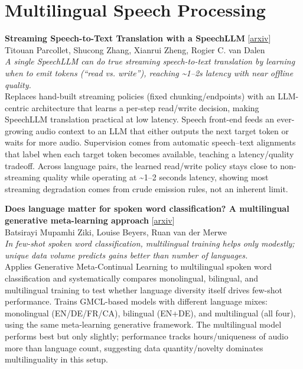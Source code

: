 \documentclass[12pt,letterpaper]{article}
\begin{document}
\medskip


\section*{Multilingual Speech Processing}

{\small\textbf{Streaming Speech-to-Text Translation with a SpeechLLM}} {\scriptsize[\href{https://arxiv.org/abs/2605.14766}{arxiv}]}\\
{\scriptsize Titouan Parcollet, Shucong Zhang, Xianrui Zheng, Rogier C. van Dalen}\\

{\small\textit{A single SpeechLLM can do true streaming speech-to-text translation by learning when to emit tokens (``read vs. write''), reaching \textasciitilde{}1--2s latency with near offline quality.}}\\[1pt]
{\footnotesize Replaces hand-built streaming policies (fixed chunking/endpoints) with an LLM-centric architecture that learns a per-step read/write decision, making SpeechLLM translation practical at low latency. Speech front-end feeds an ever-growing audio context to an LLM that either outputs the next target token or waits for more audio. Supervision comes from automatic speech--text alignments that label when each target token becomes available, teaching a latency/quality tradeoff. Across language pairs, the learned read/write policy stays close to non-streaming quality while operating at \textasciitilde{}1--2 seconds latency, showing most streaming degradation comes from crude emission rules, not an inherent limit.}

\medskip

{\small\textbf{Does language matter for spoken word classification? A multilingual generative meta-learning approach}} {\scriptsize[\href{https://arxiv.org/abs/2605.13084}{arxiv}]}\\
{\scriptsize Batsirayi Mupamhi Ziki, Louise Beyers, Ruan van der Merwe}\\

{\small\textit{In few-shot spoken word classification, multilingual training helps only modestly; unique data volume predicts gains better than number of languages.}}\\[1pt]
{\footnotesize Applies Generative Meta-Continual Learning to multilingual spoken word classification and systematically compares monolingual, bilingual, and multilingual training to test whether language diversity itself drives few-shot performance. Trains GMCL-based models with different language mixes: monolingual (EN/DE/FR/CA), bilingual (EN+DE), and multilingual (all four), using the same meta-learning generative framework. The multilingual model performs best but only slightly; performance tracks hours/uniqueness of audio more than language count, suggesting data quantity/novelty dominates multilinguality in this setup.}
\end{document}
